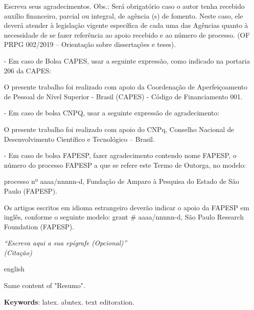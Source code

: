 \documentclass[12pt,oneside,a4paper,english]{abntex2}
\begin{document}
\begin{agradecimentos}
    Escreva seus agradecimentos.
    Obs.: Será obrigatório caso o autor tenha recebido auxílio financeiro, parcial ou integral, de agência (s) de fomento. Neste caso, ele deverá atender à legislação vigente específica de cada uma das Agências quanto à necessidade de se fazer referência ao apoio recebido e ao número de processo. (OF PRPG 002/2019 – Orientação sobre dissertações e teses).

    -	Em caso de Bolsa CAPES, usar a seguinte expressão, como indicado na portaria 206 da CAPES:

    O presente trabalho foi realizado com apoio da Coordenação de Aperfeiçoamento de Pessoal de Nível Superior - Brasil (CAPES) - Código de Financiamento 001.

    -	Em caso de bolsa CNPQ, usar a seguinte expressão de agradecimento:

    O presente trabalho foi realizado com apoio do CNPq, Conselho Nacional de Desenvolvimento Científico  e Tecnológico – Brasil.

    -	Em caso de bolsa FAPESP, fazer agradecimento contendo nome FAPESP, o número do processo FAPESP a que se refere este Termo de Outorga, no modelo:

    processo nº aaaa/nnnnn-d, Fundação de Amparo à Pesquisa do Estado de São Paulo (FAPESP).

    Os artigos escritos em idioma estrangeiro deverão indicar o apoio da FAPESP em inglês, conforme o seguinte modelo: grant \# aaaa/nnnnn-d, São Paulo Research Foundation (FAPESP).
\end{agradecimentos}

\begin{epigrafe}
    \vspace*{\fill}
    \begin{flushright}
        \textit{``Escreva aqui a sua epígrafe (Opcional)''\\
        (Citação)}
    \end{flushright}
\end{epigrafe}

\begin{resumo}[Abstract]
\begin{otherlanguage*}{english}

    Same content of "Resumo".

    \lipsum[1]

    \vspace{\onelineskip}

    \noindent
    \textbf{Keywords}:
        latex.
        abntex.
        text editoration.
\end{otherlanguage*}
\end{resumo}
\end{document}
